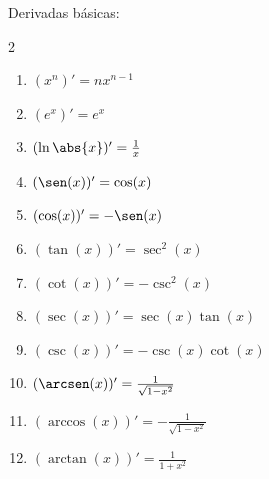 \documentclass{article}
\begin{document}
{\large Derivadas básicas:}
\begin{multicols}{2}
  \begin{enumerate}
    \item $(x^n)' = nx^{n-1}$
    \item $(e^x)' = e^x$
    \item $(\ln\abs{x})' = \frac{1}{x}$
    \item $(\sen(x))' = \cos(x)$
    \item $(\cos(x))' = -\sen(x)$
    \item $(\tan(x))' = \sec^2(x)$
    \item $(\cot(x))' = -\csc^2(x)$
    \item $(\sec(x))' = \sec(x)\tan(x)$
    \item $(\csc(x))' = -\csc(x)\cot(x)$
    \item $(\arcsen(x))' = \frac{1}{\sqrt{1-x^2}}$
    \item $(\arccos(x))' = -\frac{1}{\sqrt{1-x^2}}$
    \item $(\arctan(x))' = \frac{1}{1+x^2}$
  \end{enumerate}
\end{multicols}
\vspace{2mm}

\end{document}
